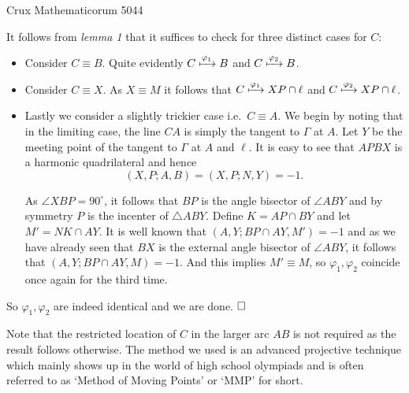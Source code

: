\begin{problem}{15}{Crux Mathematicorum 5044}
\begin{solution}
	\noindent It follows from \textit{lemma 1} that it suffices to check for three distinct cases for $C$:
	\begin{itemize}
    	\item Consider $C \equiv B$. Quite evidently $C \xmapsto{\varphi_1} B$ and $C \xmapsto{\varphi_2} B$.
    
    	\item Consider $C \equiv X$. As $X \equiv M$ it follows that $C \xmapsto{\varphi_1} XP \cap \ell$ and 
    $C \xmapsto{\varphi_2} XP \cap \ell$.
    
    	\item Lastly we consider a slightly trickier case i.e.\ $C \equiv A$. We begin by noting that in the 
    limiting case, the line $CA$ is simply the tangent to $\Gamma$ at $A$. Let $Y$ be the meeting point of 
    the tangent to $\Gamma$ at $A$ and $\ell$. It is easy to see that $APBX$ is a harmonic quadrilateral and hence
    \[
    (X,P;A,B) = (X,P;N,Y) = -1.
    \]
    
    	As $\angle XBP = 90^\circ$, it follows that $BP$ is the angle bisector of $\angle ABY$ and by symmetry 
    	$P$ is the incenter of $\triangle ABY$. Define $K = AP \cap BY$ and let $M' = NK \cap AY$. 
    	It is well known that $(A,Y; BP \cap AY, M') = -1$ and as we have already seen that $BX$ is the external 
    	angle bisector of $\angle ABY$, it follows that $(A,Y; BP \cap AY, M) = -1$. And this implies $M' \equiv M$, 
    	so $\varphi_1, \varphi_2$ coincide once again for the third time.
	\end{itemize}

	\noindent So $\varphi_1, \varphi_2$ are indeed identical and we are done. $\qedwhite$
	
	\begin{remark}[title=Comment.$\hspace{1mm}$] Note that the restricted location of $C$ in the larger arc $AB$ is not required as the result follows otherwise. The method we used is an advanced projective technique which mainly shows up in the world of high school olympiads and is often referred to as `Method of Moving Points' or `MMP' for short.
	\end{remark}
	\end{solution}
\end{problem}
